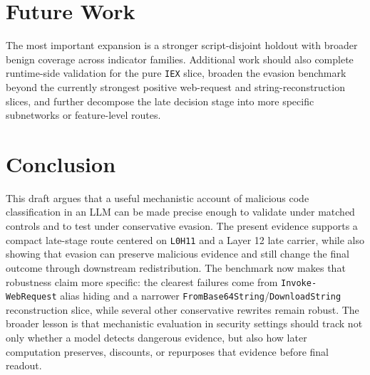 \documentclass{article}
\begin{document}
\section{Future Work}
The most important expansion is a stronger script-disjoint holdout with broader benign coverage across indicator families. Additional work should also complete runtime-side validation for the pure \texttt{IEX} slice, broaden the evasion benchmark beyond the currently strongest positive web-request and string-reconstruction slices, and further decompose the late decision stage into more specific subnetworks or feature-level routes.

\section{Conclusion}
This draft argues that a useful mechanistic account of malicious code classification in an LLM can be made precise enough to validate under matched controls and to test under conservative evasion. The present evidence supports a compact late-stage route centered on \texttt{L0H11} and a Layer 12 late carrier, while also showing that evasion can preserve malicious evidence and still change the final outcome through downstream redistribution. The benchmark now makes that robustness claim more specific: the clearest failures come from \texttt{Invoke-WebRequest} alias hiding and a narrower \texttt{FromBase64String}/\texttt{DownloadString} reconstruction slice, while several other conservative rewrites remain robust. The broader lesson is that mechanistic evaluation in security settings should track not only whether a model detects dangerous evidence, but also how later computation preserves, discounts, or repurposes that evidence before final readout.



\end{document}

